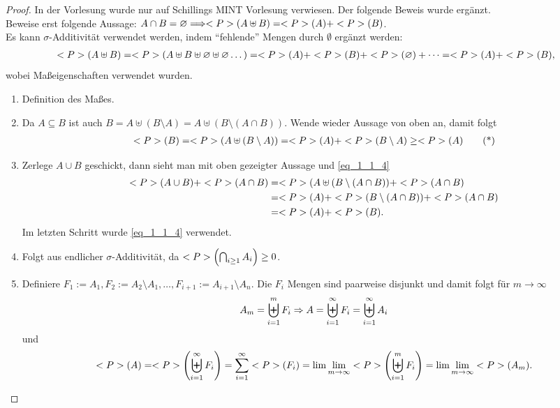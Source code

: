 \begin{proof}
	In der Vorlesung wurde nur auf Schillings MINT Vorlesung verwiesen. Der folgende Beweis wurde ergänzt.\\
	Beweise erst folgende Aussage: $A\cap B = \varnothing \Longrightarrow <P>(A \uplus B) = <P>(A) + <P>(B)$.\\
	Es kann $\sigma$-Additivität verwendet werden, indem ``fehlende'' Mengen durch $\emptyset$ ergänzt werden:
	\begin{align}
		<P>(A \uplus B) = <P>(A \uplus B \uplus \varnothing \uplus \varnothing \dots) = <P>(A) + <P>(B) + <P>(\varnothing) + \dots = <P>(A) + <P>(B),\notag
	\end{align}
	wobei Maßeigenschaften verwendet wurden.
	\begin{enumerate}
		\item Definition des Maßes.
		\item Da $A \subseteq B$ ist auch $B = A \uplus (B \setminus A) = A \uplus (B \setminus (A \cap B))$. Wende wieder Aussage von oben an, damit folgt
		\begin{align}
			<P>(B) = <P>(A \uplus (B \setminus A)) = <P>(A) + <P>(B \setminus A) \ge <P>(A) \label{eq_1_1_4}\tag{*}
		\end{align}
		\item Zerlege $A \cup B$ geschickt, dann sieht man mit oben gezeigter Aussage und \eqref{eq_1_1_4}
		\begin{align}
			<P>(A \cup B) + <P>(A \cap B) &= <P>(A \uplus (B \setminus (A \cap B)) + <P>(A \cap B)\notag \\
			&= <P>(A) + <P>(B \setminus (A \cap B)) + <P>(A \cap B)\notag\\
			&= <P>(A)+<P>(B).\notag	
		\end{align}
		Im letzten Schritt wurde \eqref{eq_1_1_4} verwendet.
		\item Folgt aus endlicher $\sigma$-Additivität, da $<P>\left(\bigcap_{i\ge 1} A_i \right) \ge 0$.
		\item Definiere $F_1 := A_1, F_2 := A_2 \setminus A_1, \dots, F_{i+1} := A_{i+1}\setminus A_n$. Die $F_i$ Mengen sind paarweise disjunkt und damit folgt für $m \to \infty$
		\begin{align}
			A_m = \biguplus_{i=1}^{m} F_i \Rightarrow A = \biguplus_{i=1}^{\infty} F_i = \biguplus_{i=1}^{\infty} A_i\notag
		\end{align}
		und
		\begin{align}
			<P>(A) = <P>\left( \biguplus_{i=1}^{\infty} F_i \right) = \sum_{i=1}^{\infty} <P>(F_i) = \lim\lim_{m \to \infty} <P>\left( \biguplus_{i=1}^{m} F_i \right) = \lim\lim_{m\to \infty} <P>(A_m). \notag
		\end{align}
	\end{enumerate}
\end{proof}

